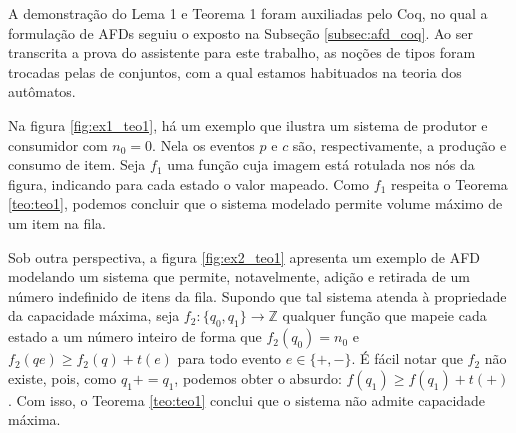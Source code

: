A demonstração do Lema 1 e Teorema 1 foram auxiliadas pelo Coq, no qual a formulação de AFDs seguiu o exposto na Subseção \ref{subsec:afd_coq}. Ao ser transcrita a prova do assistente para este trabalho, as noções de tipos foram trocadas pelas de conjuntos, com a qual estamos habituados na teoria dos autômatos.

Na figura \ref{fig:ex1_teo1}, há um exemplo que ilustra um sistema de produtor e consumidor com $n_0 = 0$. Nela os eventos $p$ e $c$ são, respectivamente, a produção e consumo de item. Seja $f_1$ uma função cuja imagem está rotulada nos nós da figura, indicando para cada estado o valor mapeado. Como $f_1$ respeita o Teorema \ref{teo:teo1}, podemos concluir que o sistema modelado permite volume máximo de um item na fila.


Sob outra perspectiva, a figura \ref{fig:ex2_teo1} apresenta um exemplo de AFD modelando um sistema que permite, notavelmente, adição e retirada de um número indefinido de itens da fila. Supondo que tal sistema atenda à propriedade da capacidade máxima, seja $f_2 : \{ q_0, q_1 \} \to \mathbb{Z}$ qualquer função que mapeie cada estado a um número inteiro de forma que $f_2(q_0) = n_0$ e $f_2(qe) \geq f_2(q) + t(e)$ para todo evento $e \in \{+,-\}$. É fácil notar que $f_2$ não existe, pois, como $q_1+ = q_1$, podemos obter o absurdo: $f(q_1) \geq f(q_1) + t(+)$. Com isso, o Teorema \ref{teo:teo1} conclui que o sistema não admite capacidade máxima.


